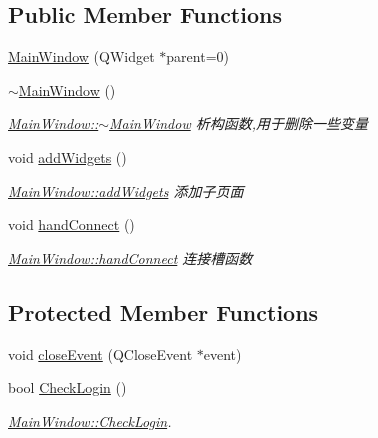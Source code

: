 \subsection*{Public Member Functions}
\begin{DoxyCompactItemize}
\item 
\mbox{\hyperlink{class_main_window_a8b244be8b7b7db1b08de2a2acb9409db}{Main\+Window}} (Q\+Widget $\ast$parent=0)
\item 
\mbox{\hyperlink{class_main_window_ae98d00a93bc118200eeef9f9bba1dba7}{$\sim$\+Main\+Window}} ()
\begin{DoxyCompactList}\small\item\em \mbox{\hyperlink{class_main_window_ae98d00a93bc118200eeef9f9bba1dba7}{Main\+Window\+::$\sim$\+Main\+Window}} 析构函数,用于删除一些变量 \end{DoxyCompactList}\item 
void \mbox{\hyperlink{class_main_window_ae449e932d7b98f64803ef7e1c9c7cb82}{add\+Widgets}} ()
\begin{DoxyCompactList}\small\item\em \mbox{\hyperlink{class_main_window_ae449e932d7b98f64803ef7e1c9c7cb82}{Main\+Window\+::add\+Widgets}} 添加子页面 \end{DoxyCompactList}\item 
void \mbox{\hyperlink{class_main_window_ad253da665707b1e03f610b2dea97976e}{hand\+Connect}} ()
\begin{DoxyCompactList}\small\item\em \mbox{\hyperlink{class_main_window_ad253da665707b1e03f610b2dea97976e}{Main\+Window\+::hand\+Connect}} 连接槽函数 \end{DoxyCompactList}\end{DoxyCompactItemize}
\subsection*{Protected Member Functions}
\begin{DoxyCompactItemize}
\item 
void \mbox{\hyperlink{class_main_window_a4e20a4a065fbb0e4d3532a45a0a91425}{close\+Event}} (Q\+Close\+Event $\ast$event)
\item 
bool \mbox{\hyperlink{class_main_window_add9eeb672a0e00eb427170f1367b2281}{Check\+Login}} ()
\begin{DoxyCompactList}\small\item\em \mbox{\hyperlink{class_main_window_add9eeb672a0e00eb427170f1367b2281}{Main\+Window\+::\+Check\+Login}}. \end{DoxyCompactList}\end{DoxyCompactItemize}
